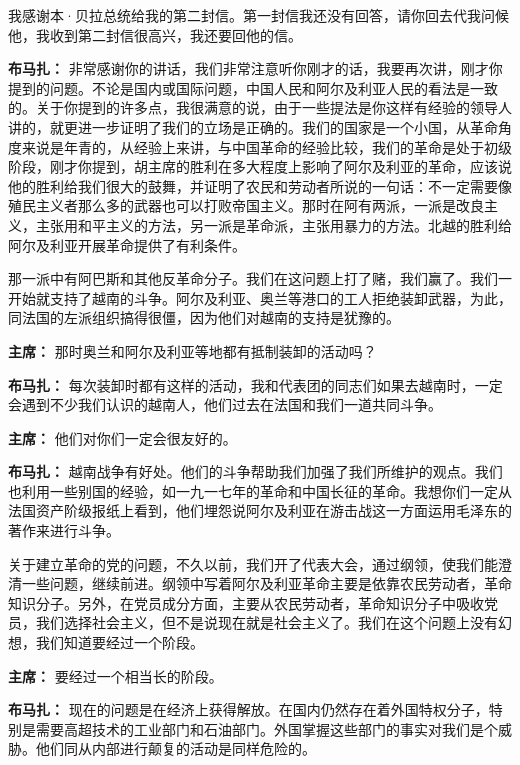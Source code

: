 \begin{list}{}
我感谢本·贝拉总统给我的第二封信。第一封信我还没有回答，请你回去代我问候他，我收到第二封信很高兴，我还要回他的信。

\item[\textbf{布马扎：}] 非常感谢你的讲话，我们非常注意听你刚才的话，我要再次讲，刚才你提到的问题。不论是国内或国际问题，中国人民和阿尔及利亚人民的看法是一致的。关于你提到的许多点，我很满意的说，由于一些提法是你这样有经验的领导人讲的，就更进一步证明了我们的立场是正确的。我们的国家是一个小国，从革命角度来说是年青的，从经验上来讲，与中国革命的经验比较，我们的革命是处于初级阶段，刚才你提到，胡主席的胜利在多大程度上影响了阿尔及利亚的革命，应该说他的胜利给我们很大的鼓舞，并证明了农民和劳动者所说的一句话：不一定需要像殖民主义者那么多的武器也可以打败帝国主义。那时在阿有两派，一派是改良主义，主张用和平主义的方法，另一派是革命派，主张用暴力的方法。北越的胜利给阿尔及利亚开展革命提供了有利条件。

那一派中有阿巴斯和其他反革命分子。我们在这问题上打了赌，我们赢了。我们一开始就支持了越南的斗争。阿尔及利亚、奥兰等港口的工人拒绝装卸武器，为此，同法国的左派组织搞得很僵，因为他们对越南的支持是犹豫的。

\item[\textbf{主席：}] 那时奥兰和阿尔及利亚等地都有抵制装卸的活动吗？

\item[\textbf{布马扎：}] 每次装卸时都有这样的活动，我和代表团的同志们如果去越南时，一定会遇到不少我们认识的越南人，他们过去在法国和我们一道共同斗争。

\item[\textbf{主席：}] 他们对你们一定会很友好的。

\item[\textbf{布马扎：}] 越南战争有好处。他们的斗争帮助我们加强了我们所维护的观点。我们也利用一些别国的经验，如一九一七年的革命和中国长征的革命。我想你们一定从法国资产阶级报纸上看到，他们埋怨说阿尔及利亚在游击战这一方面运用毛泽东的著作来进行斗争。

关于建立革命的党的问题，不久以前，我们开了代表大会，通过纲领，使我们能澄清一些问题，继续前进。纲领中写着阿尔及利亚革命主要是依靠农民劳动者，革命知识分子。另外，在党员成分方面，主要从农民劳动者，革命知识分子中吸收党员，我们选择社会主义，但不是说现在就是社会主义了。我们在这个问题上没有幻想，我们知道要经过一个阶段。

\item[\textbf{主席：}] 要经过一个相当长的阶段。

\item[\textbf{布马扎：}] 现在的问题是在经济上获得解放。在国内仍然存在着外国特权分子，特别是需要高超技术的工业部门和石油部门。外国掌握这些部门的事实对我们是个威胁。他们同从内部进行颠复的活动是同样危险的。


\end{list}
